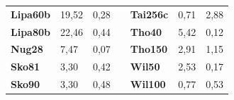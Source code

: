 \documentclass[a4paper, 12pt]{article}
\begin{document}
\begin{table}[H]
\begin{tabular}{|l|l|l|l|l|l|l|}
\textbf{Lipa60b}                    & 19,52                              & 0,28                                 &                                & \textbf{Tai256c}                   & 0,71                               & 2,88                                 \\ \cline{1-3} \cline{5-7} 
\textbf{Lipa80b}                    & 22,46                              & 0,44                                 &                                & \textbf{Tho40}                     & 5,42                               & 0,12                                 \\ \cline{1-3} \cline{5-7} 
\textbf{Nug28}                      & 7,47                               & 0,07                                 &                                & \textbf{Tho150}                    & 2,91                               & 1,15                                 \\ \cline{1-3} \cline{5-7} 
\textbf{Sko81}                      & 3,30                               & 0,42                                 &                                & \textbf{Wil50}                     & 2,53                               & 0,17                                 \\ \cline{1-3} \cline{5-7} 
\textbf{Sko90}                      & 3,30                               & 0,48                                 &                                & \textbf{Wil100}                    & 0,77                               & 0,53                                 \\ \cline{1-3} \cline{5-7} 
\end{tabular}
\end{table}
      
      \newpage
\end{document}
